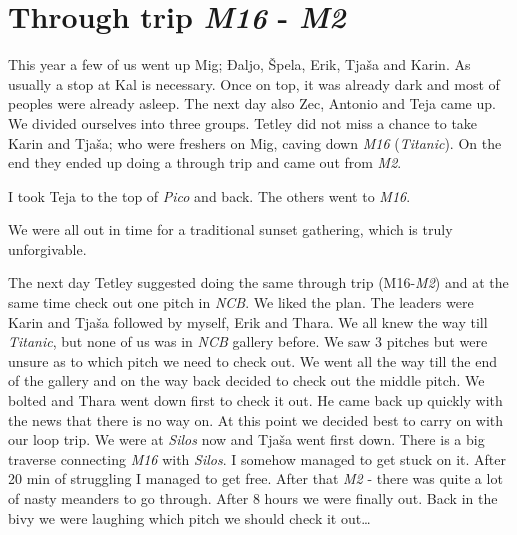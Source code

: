 \section{\texorpdfstring{Through trip \emph{M16} -
\emph{M2}}{Through trip M16 - M2}}

This year a few of us went up Mig; Đaljo, Špela, Erik, Tjaša and Karin.
As usually a stop at Kal is necessary. Once on top, it was already dark
and most of peoples were already asleep. The next day also Zec, Antonio
and Teja came up. We divided ourselves into three groups. Tetley did not
miss a chance to take Karin and Tjaša; who were freshers on Mig, caving
down \emph{M16} (\emph{Titanic}). On the end they ended up doing a
through trip and came out from \emph{M2}.

I took Teja to the top of \emph{Pico} and back. The others went to
\emph{M16}.

We were all out in time for a traditional sunset gathering, which is
truly unforgivable.

The next day Tetley suggested doing the same through trip
(M16-\emph{M2}) and at the same time check out one pitch in \emph{NCB}.
We liked the plan. The leaders were Karin and Tjaša followed by myself,
Erik and Thara. We all knew the way till \emph{Titanic}, but none of us
was in \emph{NCB} gallery before. We saw 3 pitches but were unsure as to
which pitch we need to check out. We went all the way till the end of
the gallery and on the way back decided to check out the middle pitch.
We bolted and Thara went down first to check it out. He came back up
quickly with the news that there is no way on. At this point we decided
best to carry on with our loop trip. We were at \emph{Silos} now and
Tjaša went first down. There is a big traverse connecting \emph{M16}
with \emph{Silos}. I somehow managed to get stuck on it. After 20 min of
struggling I managed to get free. After that \emph{M2} - there was quite
a lot of nasty meanders to go through. After 8 hours we were finally
out. Back in the bivy we were laughing which pitch we should check it
out\ldots{}

